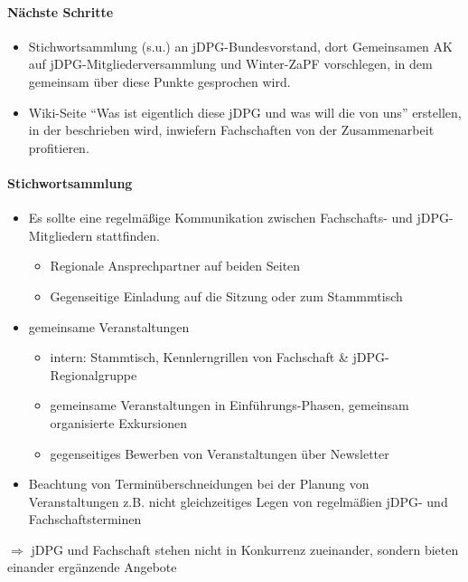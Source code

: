     \paragraph{Nächste Schritte}
      \begin{itemize}
        \item Stichwortsammlung (s.u.) an jDPG-Bundesvorstand, dort Gemeinsamen AK auf jDPG-Mitgliederversammlung und Winter-ZaPF vorschlegen, in dem gemeinsam über diese Punkte gesprochen wird.
        \item Wiki-Seite “Was ist eigentlich diese jDPG und was will die von uns” erstellen, in der beschrieben wird, inwiefern Fachschaften von der Zusammenarbeit profitieren.
      \end{itemize}

    \paragraph{Stichwortsammlung}
      \begin{itemize}
        \item Es sollte eine regelmäßige Kommunikation zwischen Fachschafts- und jDPG-Mitgliedern stattfinden.
          \begin{itemize}
            \item Regionale Ansprechpartner auf beiden Seiten
            \item Gegenseitige Einladung auf die Sitzung oder zum Stammmtisch
          \end{itemize}
        \item gemeinsame Veranstaltungen
          \begin{itemize}
            \item intern: Stammtisch, Kennlerngrillen von Fachschaft \& jDPG-Regionalgruppe
            \item gemeinsame Veranstaltungen in Einführungs-Phasen, gemeinsam organisierte Exkursionen
            \item gegenseitiges Bewerben von Veranstaltungen über Newsletter
          \end{itemize}
        \item Beachtung von Terminüberschneidungen bei der Planung von Veranstaltungen
        z.B. nicht gleichzeitiges Legen von regelmäßien jDPG- und Fachschaftsterminen
      \end{itemize}

      $\Rightarrow$ jDPG und Fachschaft stehen nicht in Konkurrenz zueinander, sondern bieten einander ergänzende Angebote
